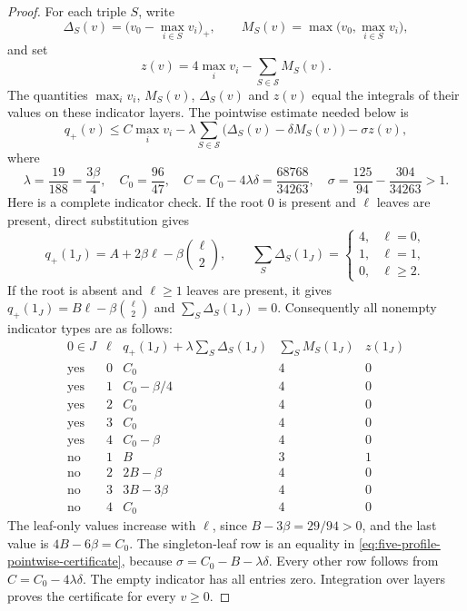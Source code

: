 \begin{proof}
For each triple $S$, write
\[
 \Delta_S(v)=\bigl(v_0-\max_{i\in S}v_i\bigr)_+,\qquad
 M_S(v)=\max\bigl(v_0,\max_{i\in S}v_i\bigr),
\]
and set
\[
 z(v)=4\max_i v_i-\sum_{S\in\mathcal S}M_S(v).
\]
The quantities $\max_i v_i$, $M_S(v)$, $\Delta_S(v)$ and $z(v)$
equal the integrals of their values on these indicator layers.
The pointwise estimate needed below is
\begin{equation}\label{eq:five-profile-pointwise-certificate}
 q_+(v)\le C\max_i v_i
 -\lambda\sum_{S\in\mathcal S}
       \bigl(\Delta_S(v)-\delta M_S(v)\bigr)-\sigma z(v),
\end{equation}
where
\[
 \lambda=\frac{19}{188}=\frac{3\beta}{4},\quad
 C_0=\frac{96}{47},\quad
 C=C_0-4\lambda\delta=\frac{68768}{34263},\quad
 \sigma=\frac{125}{94}-\frac{304}{34263}>1.
\]
Here is a complete indicator check.
If the root $0$ is present and $\ell$ leaves are present, direct
substitution gives
\[
 q_+(1_J)=A+2\beta\ell-\beta\binom{\ell}{2},\qquad
 \sum_S\Delta_S(1_J)=
 \begin{cases}4,&\ell=0,\\1,&\ell=1,\\0,&\ell\ge2.\end{cases}
\]
If the root is absent and $\ell\ge1$ leaves are present, it gives
$q_+(1_J)=B\ell-\beta\binom{\ell}{2}$ and
$\sum_S\Delta_S(1_J)=0$.  Consequently all nonempty indicator types
are as follows:
\[
\begin{array}{c|c|c|c|c}
0\in J&\ell&
q_+(1_J)+\lambda\sum_S\Delta_S(1_J)&
\sum_SM_S(1_J)&z(1_J)\\ \hline
\text{yes}&0&C_0&4&0\\
\text{yes}&1&C_0-\beta/4&4&0\\
\text{yes}&2&C_0&4&0\\
\text{yes}&3&C_0&4&0\\
\text{yes}&4&C_0-\beta&4&0\\
\text{no}&1&B&3&1\\
\text{no}&2&2B-\beta&4&0\\
\text{no}&3&3B-3\beta&4&0\\
\text{no}&4&C_0&4&0
\end{array}
\]
The leaf-only values increase with $\ell$, since
$B-3\beta=29/94>0$, and the last value is
$4B-6\beta=C_0$.  The singleton-leaf row is an equality in
\eqref{eq:five-profile-pointwise-certificate}, because
$\sigma=C_0-B-\lambda\delta$.  Every other row follows from
$C=C_0-4\lambda\delta$.  The empty indicator has all entries zero.
Integration over layers proves the certificate for every $v\ge0$.


\end{proof}
